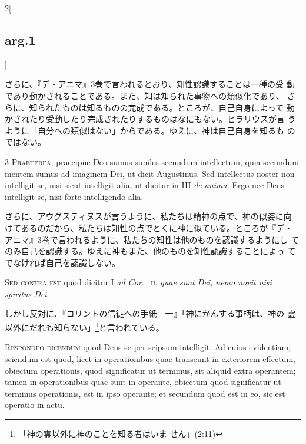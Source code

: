 \documentclass[paper=a4paper,fontsize=10pt,jafontsize=9pt,titlepage]{jlreq}
\begin{document}
\begin{paracol}{2}[\subsection{arg.1}]
\switchcolumn

さらに、『デ・アニマ』3巻で言われるとおり、知性認識することは一種の受
動であり動かされることである。また、知は知られた事物への類似化であり、
さらに、知られたものは知るものの完成である。ところが、自己自身によって
動かされたり受動したり完成されたりするものはなにもない。ヒラリウスが言
うように「自分への類似はない」からである。ゆえに、神は自己自身を知るも
のではない。


{\scshape 3 Praeterea}, praecipue Deo sumus similes secundum
intellectum, quia secundum mentem sumus ad imaginem Dei, ut dicit
Augustinus. Sed intellectus noster non intelligit se, nisi sicut
intelligit alia, ut dicitur in III {\itshape de anima}. Ergo nec Deus
intelligit se, nisi forte intelligendo alia.

\switchcolumn

さらに、アウグスティヌスが言うように、私たちは精神の点で、神の似姿に向
けてあるのだから、私たちは知性の点でとくに神に似ている。ところが『デ・
アニマ』3巻で言われるように、私たちの知性は他のものを認識するようにし
てのみ自己を認識する。ゆえに神もまた、他のものを知性認識することによっ
てでなければ自己を認識しない。

\switchcolumn*[\subsection{s.c.}]

{\scshape Sed contra est} quod dicitur I {\itshape ad Cor}.~{\scshape
ii}, {\itshape quae sunt Dei, nemo novit nisi spiritus Dei}.

\switchcolumn

しかし反対に、『コリントの信徒への手紙　一』「神にかんする事柄は、神の
霊以外にだれも知らない」\footnote{「神の霊以外に神のことを知る者はいま
せん」(2:11)}と言われている。


{\scshape Respondeo dicendum} quod Deus se per seipsum intelligit. Ad
cuius evidentiam, sciendum est quod, licet in operationibus quae
transeunt in exteriorem effectum, obiectum operationis, quod
significatur ut terminus, sit aliquid extra operantem; tamen in
operationibus quae sunt in operante, obiectum quod significatur ut
terminus operationis, est in ipso operante; et secundum quod est in
eo, sic est operatio in actu.


\end{paracol}
\end{document}
